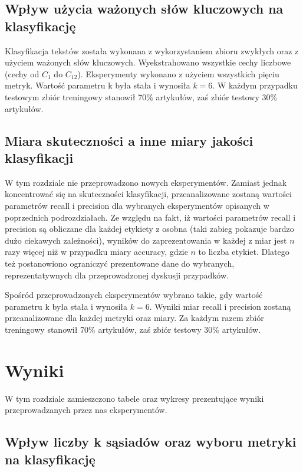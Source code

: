 \documentclass{classrep}
\begin{document}
\subsection{Wpływ użycia ważonych słów kluczowych na klasyfikację}
Klasyfikacja tekstów została wykonana z wykorzystaniem zbioru zwykłych oraz z użyciem ważonych słów kluczowych. Wyekstrahowano wszystkie cechy liczbowe (cechy od $C_1$ do $C_{12}$). Eksperymenty wykonano z użyciem wszystkich pięciu metryk. Wartość parametru k była stała i wynosiła $k=6$. W każdym przypadku testowym zbiór treningowy stanowił 70\% artykułów, zaś zbiór testowy 30\% artykułów.

\subsection{Miara skuteczności a inne miary jakości klasyfikacji}
W tym rozdziale nie przeprowadzono nowych eksperymentów. Zamiast jednak koncentrować się na skuteczności klasyfikacji, przeanalizowane zostaną wartości parametrów recall i precision dla wybranych eksperymentów opisanych w poprzednich podrozdziałach. Ze względu na fakt, iż wartości parametrów recall i precision są obliczane dla każdej etykiety z osobna (taki zabieg pokazuje bardzo dużo ciekawych zależności), wyników do zaprezentowania w każdej z miar jest $n$ razy więcej niż w przypadku miary accuracy, gdzie $n$ to liczba etykiet. Dlatego też postanowiono ograniczyć prezentowane dane do wybranych, reprezentatywnych dla przeprowadzonej dyskusji przypadków. \newline

Spośród przeprowadzonych eksperymentów wybrano takie, gdy wartość parametru k była stała i wynosiła $k=6$. Wyniki miar recall i precision zostaną przeanalizowane dla każdej metryki oraz miary. Za każdym razem zbiór treningowy stanowił 70\% artykułów, zaś zbiór testowy 30\% artykułów. 

\section{Wyniki}
W tym rozdziale zamieszczono tabele oraz wykresy prezentujące wyniki przeprowadzanych przez nas eksperymentów.

\subsection{Wpływ liczby k sąsiadów oraz wyboru metryki na klasyfikację}
\end{document}
